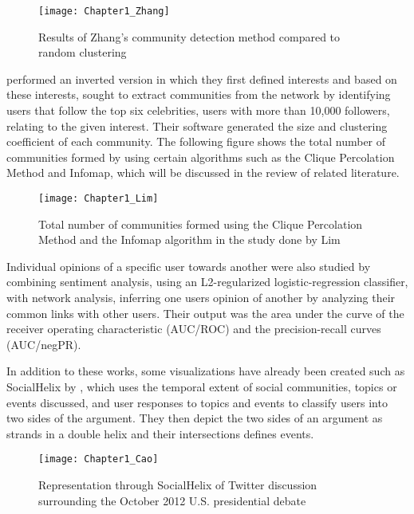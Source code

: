 \begin{figure} [h]
	\centering
	\texttt{[image: Chapter1\_Zhang]}
	\caption{Results of Zhang’s community detection method compared to random clustering}	
\end{figure}



 performed an inverted version in which they first defined interests and based on these interests, sought to extract communities from the network by identifying users that follow the top six celebrities, users with more than 10,000 followers, relating to the given interest. Their software generated the size and clustering coefficient of each community. The following figure shows the total number of communities formed by using certain algorithms such as the Clique Percolation Method and Infomap, which will be discussed in the review of related literature.



\begin{figure} [h]
	\centering
	\texttt{[image: Chapter1\_Lim]}
	\caption{Total number of communities formed using the Clique Percolation Method and the Infomap algorithm in the study done by Lim}	
\end{figure}

Individual opinions of a specific user towards another were also studied by  combining sentiment analysis, using an L2-regularized logistic-regression classifier, with network analysis, inferring one user\vtick s opinion of another by analyzing their common links with other users. Their output was the area under the curve of the receiver operating characteristic (AUC/ROC) and the precision-recall curves (AUC/negPR). \par

In addition to these works, some visualizations have already been created such as SocialHelix by , which uses the temporal extent of social communities, topics or events discussed, and user responses to topics and events to classify users into two sides of the argument. They then depict the two sides of an argument as strands in a double helix and their intersections defines events.


\begin{figure} [h]
	\centering
	\texttt{[image: Chapter1\_Cao]}
	\caption{Representation through SocialHelix of Twitter discussion surrounding the October 2012 U.S. presidential debate}	
\end{figure}



